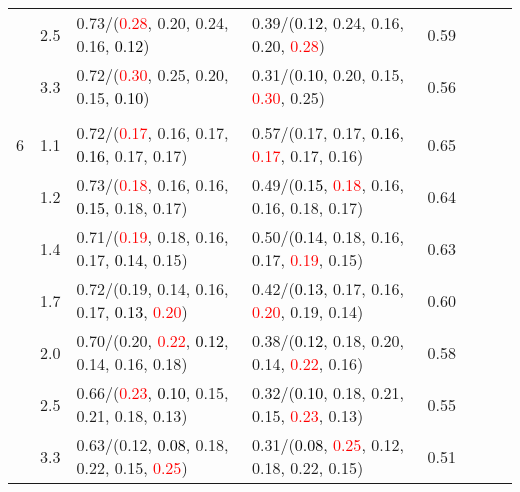 \documentclass[10pt,a4paper]{report}
\begin{document}
\begin{table}[!htbp]
\begin{center}
{\begin{tabular}{ccllcccc}
			&2.5&0.73/(\textcolor{red}{0.28}, 0.20, 0.24, 0.16, \textcolor{black}{0.12})&0.39/(\textcolor{black}{0.12}, 0.24, 0.16, 0.20, \textcolor{red}{0.28})&0.59\\
			&3.3&0.72/(\textcolor{red}{0.30}, 0.25, 0.20, 0.15, \textcolor{black}{0.10})&0.31/(\textcolor{black}{0.10}, 0.20, 0.15, \textcolor{red}{0.30}, 0.25)&0.56\\
			&&&&\\
			6			&1.1&0.72/(\textcolor{red}{0.17}, 0.16, 0.17, \textcolor{black}{0.16}, 0.17, 0.17)&0.57/(0.17, 0.17, \textcolor{black}{0.16}, \textcolor{red}{0.17}, 0.17, 0.16)&0.65\\
			&1.2&0.73/(\textcolor{red}{0.18}, 0.16, 0.16, \textcolor{black}{0.15}, 0.18, 0.17)&0.49/(\textcolor{black}{0.15}, \textcolor{red}{0.18}, 0.16, 0.16, 0.18, 0.17)&0.64\\
			&1.4&0.71/(\textcolor{red}{0.19}, 0.18, 0.16, 0.17, \textcolor{black}{0.14}, 0.15)&0.50/(\textcolor{black}{0.14}, 0.18, 0.16, 0.17, \textcolor{red}{0.19}, 0.15)&0.63\\
			&1.7&0.72/(0.19, 0.14, 0.16, 0.17, \textcolor{black}{0.13}, \textcolor{red}{0.20})&0.42/(\textcolor{black}{0.13}, 0.17, 0.16, \textcolor{red}{0.20}, 0.19, 0.14)&0.60\\
			&2.0&0.70/(0.20, \textcolor{red}{0.22}, \textcolor{black}{0.12}, 0.14, 0.16, 0.18)&0.38/(\textcolor{black}{0.12}, 0.18, 0.20, 0.14, \textcolor{red}{0.22}, 0.16)&0.58\\
			&2.5&0.66/(\textcolor{red}{0.23}, \textcolor{black}{0.10}, 0.15, 0.21, 0.18, 0.13)&0.32/(\textcolor{black}{0.10}, 0.18, 0.21, 0.15, \textcolor{red}{0.23}, 0.13)&0.55\\
			&3.3&0.63/(0.12, \textcolor{black}{0.08}, 0.18, 0.22, 0.15, \textcolor{red}{0.25})&0.31/(\textcolor{black}{0.08}, \textcolor{red}{0.25}, 0.12, 0.18, 0.22, 0.15)&0.51\\
			\bottomrule
		\end{tabular}}
	\end{center}
\end{table}
\end{document}
